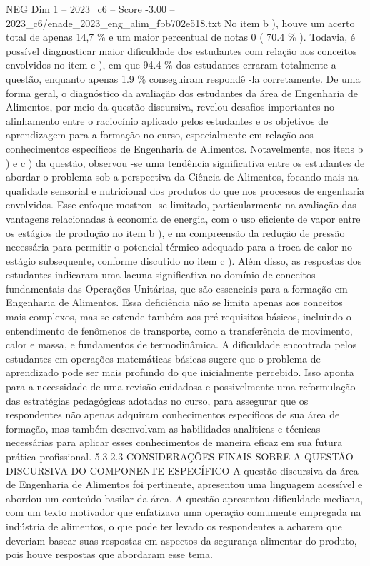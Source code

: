 \begin{textsample}{NEG Dim 1 – 2023\_c6 – Score -3.00 – 2023\_c6/enade\_2023\_eng\_alim\_fbb702e518.txt}
No item b ), houve um acerto total de apenas 14,7 \% e um maior percentual de notas 0 ( 70.4 \% ).
Todavia, é possível diagnosticar maior dificuldade dos estudantes com relação aos conceitos envolvidos no item c ), em que 94.4 \% dos estudantes erraram totalmente a questão, enquanto apenas 1.9 \% conseguiram respondê -la corretamente.
De uma forma geral, o diagnóstico da avaliação dos estudantes da área de Engenharia de Alimentos, por meio da questão discursiva, revelou desafios importantes no alinhamento entre o raciocínio aplicado pelos estudantes e os objetivos de aprendizagem para a formação no curso, especialmente em relação aos conhecimentos específicos de Engenharia de Alimentos.
Notavelmente, nos itens b ) e c ) da questão, observou -se uma tendência significativa entre os estudantes de abordar o problema sob a perspectiva da Ciência de Alimentos, focando mais na qualidade sensorial e nutricional dos produtos do que nos processos de engenharia envolvidos.
Esse enfoque mostrou -se limitado, particularmente na avaliação das vantagens relacionadas à economia de energia, com o uso eficiente de vapor entre os estágios de produção no item b ), e na compreensão da redução de pressão necessária para permitir o potencial térmico adequado para a troca de calor no estágio subsequente, conforme discutido no item c ).
Além disso, as respostas dos estudantes indicaram uma lacuna significativa no domínio de conceitos fundamentais das Operações Unitárias, que são essenciais para a formação em Engenharia de Alimentos.
Essa deficiência não se limita apenas aos conceitos mais complexos, mas se estende também aos pré-requisitos básicos, incluindo o entendimento de fenômenos de transporte, como a transferência de movimento, calor e massa, e fundamentos de termodinâmica.
A dificuldade encontrada pelos estudantes em operações matemáticas básicas sugere que o problema de aprendizado pode ser mais profundo do que inicialmente percebido.
Isso aponta para a necessidade de uma revisão cuidadosa e possivelmente uma reformulação das estratégias pedagógicas adotadas no curso, para assegurar que os respondentes não apenas adquiram conhecimentos específicos de sua área de formação, mas também desenvolvam as habilidades analíticas e técnicas necessárias para aplicar esses conhecimentos de maneira eficaz em sua futura prática profissional. 5.3.2.3 CONSIDERAÇÕES FINAIS SOBRE A QUESTÃO DISCURSIVA DO COMPONENTE ESPECÍFICO A questão discursiva da área de Engenharia de Alimentos foi pertinente, apresentou uma linguagem acessível e abordou um conteúdo basilar da área.
A questão apresentou dificuldade mediana, com um texto motivador que enfatizava uma operação comumente empregada na indústria de alimentos, o que pode ter levado os respondentes a acharem que deveriam basear suas respostas em aspectos da segurança alimentar do produto, pois houve respostas que abordaram esse tema.

\end{textsample}
